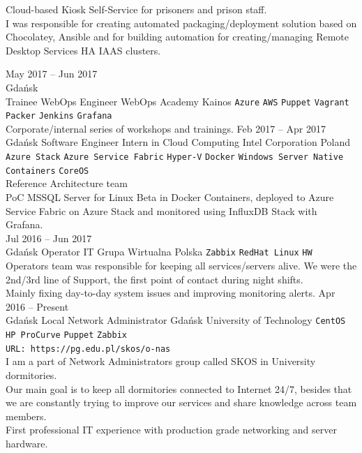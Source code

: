 \documentclass[9pt]{style/developercv}
\begin{document}
\begin{entrylist}
{      Cloud-based Kiosk Self-Service for prisoners and prison staff. \\
      I was responsible for creating automated packaging/deployment solution based on Chocolatey, Ansible and
      for building automation for creating/managing Remote Desktop Services HA IAAS clusters.

		}
	\entry
    {May 2017 -- Jun 2017\\\footnotesize{Gdańsk}\\
    \footnotesize{Trainee WebOps Engineer}}
		{WebOps Academy}
		{Kainos}
		{
			\texttt{Azure}\slashsep
			\texttt{AWS}\slashsep
			\texttt{Puppet}\slashsep
			\texttt{Vagrant}\slashsep
			\texttt{Packer}\slashsep
			\texttt{Jenkins}\slashsep
			\texttt{Grafana}\\

      Corporate/internal series of workshops and trainings.
		}
	\entry
		{Feb 2017 -- Apr 2017\\\footnotesize{Gdańsk}}
		{Software Engineer Intern in Cloud Computing}
		{Intel Corporation Poland}
		{
      \texttt{Azure Stack}\slashsep
      \texttt{Azure Service Fabric}\slashsep
      \texttt{Hyper-V}\slashsep
      \texttt{Docker}\slashsep
			\texttt{Windows Server Native Containers}\slashsep
			\texttt{CoreOS}\\

      Reference Architecture team\\
      PoC MSSQL Server for Linux Beta in Docker Containers, deployed to Azure Service Fabric on Azure Stack and
      monitored using InfluxDB Stack with Grafana. \\
		}
	\entry
    {Jul 2016 -- Jun 2017\\\footnotesize{Gdańsk}}
		{Operator IT}
		{Grupa Wirtualna Polska}
		{
			\texttt{Zabbix}\slashsep
			\texttt{RedHat Linux}\slashsep
			\texttt{HW}\\

      Operators team was responsible for keeping all services/servers alive.
      We were the 2nd/3rd line of Support, the first point of contact during night shifts.\\
      Mainly fixing day-to-day system issues and improving monitoring alerts.
		}
	\entry
    {Apr 2016 -- Present\\\footnotesize{Gdańsk}}
    {Local Network Administrator}
    {Gdańsk University of Technology}
		{
			\texttt{CentOS}\slashsep
			\texttt{HP ProCurve}\slashsep
			\texttt{Puppet}\slashsep
			\texttt{Zabbix}\\
      \texttt{URL: https://pg.edu.pl/skos/o-nas}\\

      I am a part of Network Administrators group called SKOS in University dormitories.\\
      Our main goal is to keep all dormitories connected to Internet 24/7,
      besides that we are constantly trying to improve our services and share knowledge across team members.\\
			First professional IT experience with production grade networking and server hardware.
		}
\end{entrylist}
\end{document}
